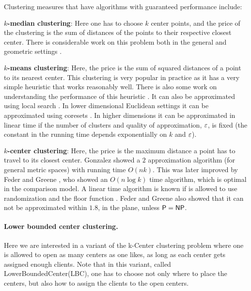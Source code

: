 \ifx\STACS\undefined \documentclass[12pt]{article}\else \documentclass[runningheads,a4paper]{llncs}
\newcommand{\LowerBoundedCenter}   {\PStyle{{Lower{}Bounded{}Center}}\xspace}
\newcommand{\kCenter} {\PStyle{k-Center}\xspace}
\newcommand{\lbc}{\PStyle{LBC}\xspace}
\newcommand{\pth}[2][\!]{#1\left({#2}\right)}
\newcommand{\PStyle}[1]{\textcolor{red25}{\textrm{\textsf{#1}}}}
\begin{document}
Clustering measures that have algorithms with guaranteed performance
include:
\begin{compactitem}\item \textbf{$k$-median clustering}: Here one has to choose $k$
    center points, and the price of the clustering is the sum of
    distances of the points to their respective closest center. There
    is considerable work on this problem both in the general and
    geometric settings \cite{arr-asekm-98,cgts-caamp-99,agkmp-lshkm-01,c-kmchd-06,c-cfaak-08}.

    \item \textbf{$k$-means clustering}: Here, the price is the sum of
    squared distances of a point to its nearest center. This
    clustering is very popular in practice as it has a very simple
    heuristic that works reasonably well. There is also some work on
    understanding the performance of this heuristic 
    \cite{l-lsqp-82,hs-hfkmm-05,amr-sakmm-11}.  
    It can also be approximated using local search
    \cite{kmnpsw-lsaak-04}. In lower dimensional Euclidean settings it
    can be approximated using coresets \cite{hk-sckmk-07}. In higher
    dimensions it can be approximated in linear time if the number of
    clusters and quality of approximation, $\varepsilon$, is fixed \cite{kss-ltasc-10}
    (the constant in the running time depends exponentially on $k$ and
    $\varepsilon$).
   
    \item \textbf{$k$-center clustering}: Here, the price is the
    maximum distance a point has to travel to its closest center.
    Gonzalez \cite{g-cmmid-85} showed a $2$ approximation algorithm
    (for general metric spaces) with running time $O(nk)$. This was
    later improved by Feder and Greene \cite{fg-oafac-88}, who showed
    an $O\pth{n \log k}$ time algorithm, which is optimal in the
    comparison model.  A linear time algorithm is known if is allowed
    to use randomization and the floor function \cite{h-cm-04}.  Feder
    and Greene also showed that it can not be approximated within
    $1.8$, in the plane, unless $\textsf{P} = \textsf{NP}$.
\end{compactitem}


\paragraph*{Lower bounded center clustering.}
Here we are interested in a variant of the \kCenter clustering
problem where one is allowed to open as many centers as one likes, as
long as each center gets assigned enough clients.  Note that in this
variant, called \LowerBoundedCenter (\lbc), one has to choose not
only where to place the centers, but also how to assign the clients
to the open centers.
\end{document}
